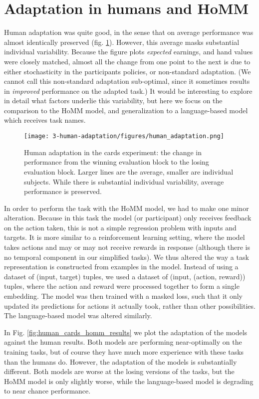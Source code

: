 \section{Adaptation in humans and HoMM}
Human adaptation was quite good, in the sense that on average performance was almost identically preserved (fig. \ref{fig:human_cards_adaptation_results}). However, this average masks substantial individual variability. Because the figure plots \emph{expected} earnings, and hand values were closely matched, almost all the change from one point to the next is due to either stochasticity in the participants policies, or non-standard adaptation. (We cannot call this non-standard adaptation sub-optimal, since it sometimes results in \emph{improved} performance on the adapted task.) It would be interesting to explore in detail what factors underlie this variability, but here we focus on the comparison to the HoMM model, and generalization to a language-based model which receives task names. \par  
\begin{figure}
\centering
\texttt{[image: 3-human-adaptation/figures/human\_adaptation.png]}
\caption{Human adaptation in the cards experiment: the change in performance from the winning evaluation block to the losing evaluation block. Larger lines are the average, smaller are individual subjects. While there is substantial individual variability, average performance is preserved.} \label{fig:human_cards_adaptation_results}
\end{figure}
In order to perform the task with the HoMM model, we had to make one minor alteration. Because in this task the model (or participant) only receives feedback on the action taken, this is not a simple regression problem with inputs and targets. It is more similar to a reinforcement learning setting, where the model takes actions and may or may not receive rewards in response (although there is no temporal component in our simplified tasks). We thus altered the way a task representation is constructed from examples in the model. Instead of using a dataset of (input, target) tuples, we used a dataset of (input, (action, reward)) tuples, where the action and reward were processed together to form a single embedding. The model was then trained with a masked loss, such that it only updated its predictions for actions it actually took, rather than other possibilities. The language-based model was altered similarly. \par
In Fig. \ref{fig:human_cards_homm_results} we plot the adaptation of the models against the human results. Both models are performing near-optimally on the training tasks, but of course they have much more experience with these tasks than the humans do. However, the adaptation of the models is substantially different. Both models are worse at the losing versions of the tasks, but the HoMM model is only slightly worse, while the language-based model is degrading to near chance performance. \par
